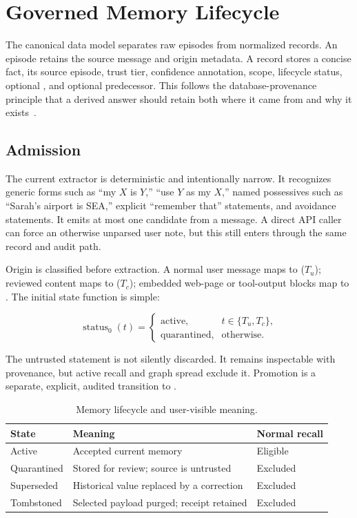 \section{Governed Memory Lifecycle}
\label{sec:lifecycle}

The canonical data model separates raw episodes from normalized records. An episode retains the source message and origin metadata. A record stores a concise fact, its source episode, trust tier, confidence annotation, scope, lifecycle status, optional , and optional predecessor. This follows the database-provenance principle that a derived answer should retain both where it came from and why it exists~\cite{buneman2001provenance}.

\subsection{Admission}

The current extractor is deterministic and intentionally narrow. It recognizes generic forms such as ``my $X$ is $Y$,'' ``use $Y$ as my $X$,'' named possessives such as ``Sarah's airport is SEA,'' explicit ``remember that'' statements, and avoidance statements. It emits at most one candidate from a message. A direct API caller can force an otherwise unparsed user note, but this still enters through the same record and audit path.

Origin is classified before extraction. A normal user message maps to  ($T_u$); reviewed content maps to  ($T_c$); embedded web-page or tool-output blocks map to . The initial state function is simple:

\begin{equation}
\operatorname{status}_0(t)=
\begin{cases}
\text{active}, & t\in\{T_u,T_c\},\\
\text{quarantined}, & \text{otherwise}.
\end{cases}
\end{equation}

The untrusted statement is not silently discarded. It remains inspectable with provenance, but active recall and graph spread exclude it. Promotion is a separate, explicit, audited transition to .

\begin{table}[t]
\centering
\caption{Memory lifecycle and user-visible meaning.}
\label{tab:lifecycle}
\small
\begin{tabularx}{\columnwidth}{@{}lYY@{}}
\toprule
State & Meaning & Normal recall \\
\midrule
Active & Accepted current memory & Eligible \\
Quarantined & Stored for review; source is untrusted & Excluded \\
Superseded & Historical value replaced by a correction & Excluded \\
Tombstoned & Selected payload purged; receipt retained & Excluded \\
\bottomrule
\end{tabularx}
\end{table}

